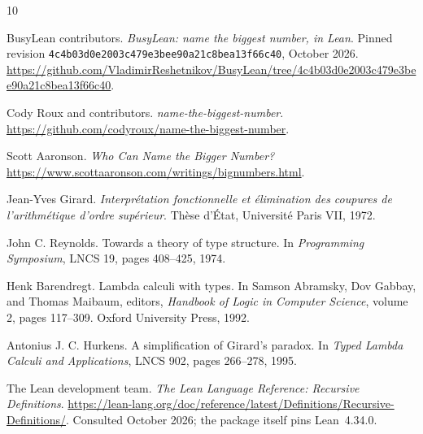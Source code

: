 \documentclass[11pt]{article}
\theoremstyle{definition}
\theoremstyle{remark}
\newcommand{\pin}{\texttt{4c4b03d0e2003c479e3bee90a21c8bea13f66c40}}
\begin{document}
\begin{thebibliography}{10}
\small

BusyLean contributors.
\emph{BusyLean: name the biggest number, in Lean}.
Pinned revision \pin, October 2026.
\url{https://github.com/VladimirReshetnikov/BusyLean/tree/4c4b03d0e2003c479e3bee90a21c8bea13f66c40}.

Cody Roux and contributors.
\emph{name-the-biggest-number}.
\url{https://github.com/codyroux/name-the-biggest-number}.

Scott Aaronson.
\emph{Who Can Name the Bigger Number?}
\url{https://www.scottaaronson.com/writings/bignumbers.html}.

Jean-Yves Girard.
\emph{Interpr\'etation fonctionnelle et \'elimination des coupures de
l'arithm\'etique d'ordre sup\'erieur}.
Th\`ese d'\'Etat, Universit\'e Paris VII, 1972.

John C. Reynolds.
Towards a theory of type structure.
In \emph{Programming Symposium}, LNCS 19, pages 408--425, 1974.

Henk Barendregt.
Lambda calculi with types.
In Samson Abramsky, Dov Gabbay, and Thomas Maibaum, editors,
\emph{Handbook of Logic in Computer Science}, volume 2, pages 117--309.
Oxford University Press, 1992.

Antonius J. C. Hurkens.
A simplification of Girard's paradox.
In \emph{Typed Lambda Calculi and Applications}, LNCS 902, pages 266--278,
1995.

The Lean development team.
\emph{The Lean Language Reference: Recursive Definitions}.
\url{https://lean-lang.org/doc/reference/latest/Definitions/Recursive-Definitions/}.
Consulted October 2026; the package itself pins Lean~4.34.0.

\end{thebibliography}
\end{document}

